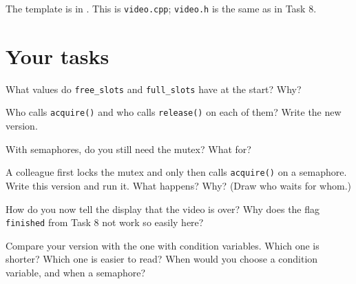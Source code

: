 \codesection

The template is in . This is \texttt{video.cpp}; \texttt{video.h} is the same as in Task 8.


\runline

\section{Your tasks}

\begin{questions}
  \item What values do \texttt{free\_slots} and \texttt{full\_slots} have at the start? Why?
  \item Who calls \texttt{acquire()} and who calls \texttt{release()} on each of them? Write the new version.
  \item With semaphores, do you still need the mutex? What for?
  \item A colleague first locks the mutex and only then calls \texttt{acquire()} on a semaphore.
        Write this version and run it. What happens? Why? (Draw who waits for whom.)
  \item How do you now tell the display that the video is over? Why does the flag \texttt{finished}
        from Task 8 not work so easily here?
  \item Compare your version with the one with condition variables. Which one is shorter? Which one is easier to
        read? When would you choose a condition variable, and when a semaphore?
\end{questions}
